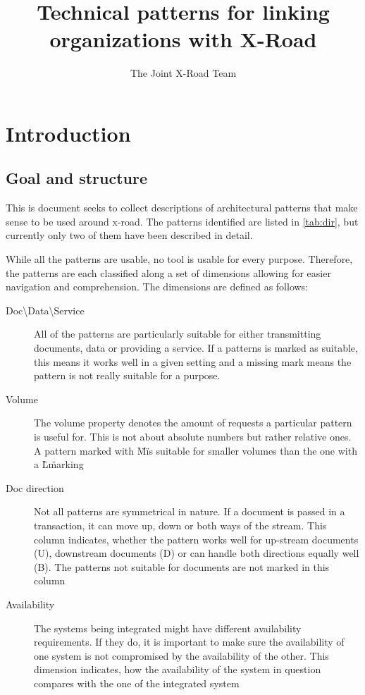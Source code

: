 \documentclass[10pt,a4paper]{article}
\title{Technical patterns for linking organizations with X-Road}
\author{The Joint X-Road Team}
\begin{document}
\maketitle
\clearpage
\setcounter{tocdepth}{2}
\tableofcontents
\clearpage

\section{Introduction}
\subsection{Goal and structure}
This is document seeks to collect descriptions of architectural patterns that make sense to be used around x-road. The patterns identified are listed in \ref{tab:dir}, but currently only two of them have been described in detail.

While all the patterns are usable, no tool is usable for every purpose. Therefore, the patterns are each classified along a set of dimensions allowing for easier navigation and comprehension. The dimensions are defined as follows:
\begin{description}
	\item[Doc\textbackslash Data\textbackslash Service] All of the patterns are particularly suitable for either transmitting documents, data or providing a service. If a patterns is marked as suitable, this means it works well in a given setting and a missing mark means the pattern is not really suitable for a purpose. 
	\item[Volume] The volume property denotes the amount of requests a particular pattern is useful for. This is not about absolute numbers but rather relative ones. A pattern marked with \"M\" is suitable for smaller volumes than the one with a \"L\" marking
	\item[Doc direction] Not all patterns are symmetrical in nature. If a document is passed in a transaction, it can move up, down or both ways of the stream. This column indicates, whether the pattern works well for up-stream documents (U), downstream documents (D) or can handle both directions equally well (B). The patterns not suitable for documents are not marked in this column
	 \item[Availability] The systems being integrated might have different availability requirements. If they do, it is important to make sure the availability of one system is not compromised by the availability of the other. This dimension indicates, how the availability of the system in question compares with the one of the integrated system
\end{description}
\end{document}
